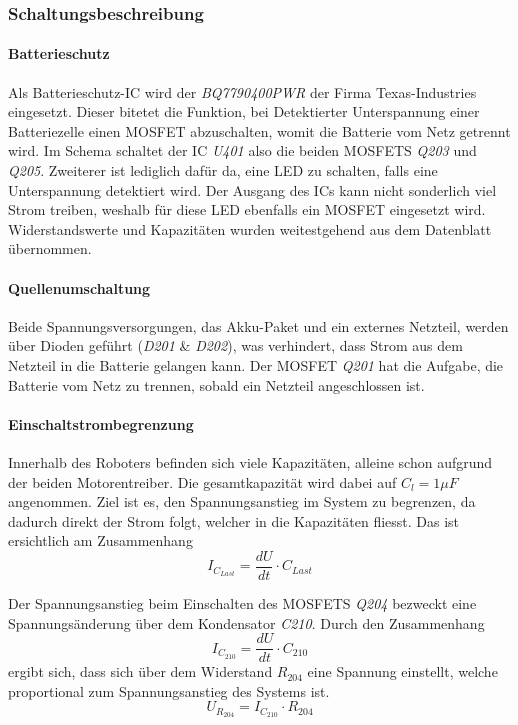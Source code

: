 \documentclass[main.tex]{subfiles} %
\begin{document}
\subsubsection*{Schaltungsbeschreibung}

\paragraph{Batterieschutz}
Als Batterieschutz-IC wird der \textit{BQ7790400PWR} der Firma Texas-Industries
eingesetzt. Dieser bitetet die Funktion, bei Detektierter Unterspannung einer
Batteriezelle einen MOSFET abzuschalten, womit die Batterie vom Netz getrennt
wird. Im Schema schaltet der IC \textit{U401} also die beiden MOSFETS
\textit{Q203} und \textit{Q205}. Zweiterer ist lediglich dafür da, eine LED zu
schalten, falls eine Unterspannung detektiert wird. Der Ausgang des ICs kann
nicht sonderlich viel Strom treiben, weshalb für diese LED ebenfalls ein MOSFET
eingesetzt wird. Widerstandswerte und Kapazitäten wurden weitestgehend aus dem
Datenblatt übernommen.

\paragraph{Quellenumschaltung}
Beide Spannungsversorgungen, das Akku-Paket und ein externes Netzteil, werden
über Dioden geführt (\textit{D201} \& \textit{D202}), was verhindert, dass
Strom aus dem Netzteil in die Batterie gelangen kann. Der MOSFET \textit{Q201}
hat die Aufgabe, die Batterie vom Netz zu trennen, sobald ein Netzteil
angeschlossen ist.

\paragraph{Einschaltstrombegrenzung}
Innerhalb des Roboters befinden sich viele Kapazitäten, alleine schon aufgrund
der beiden Motorentreiber. Die gesamtkapazität wird dabei auf $C_l = 1 \mu F$
angenommen. Ziel ist es, den Spannungsanstieg im System zu begrenzen, da
dadurch direkt der Strom folgt, welcher in die Kapazitäten fliesst. Das ist
ersichtlich am Zusammenhang
\[
    I_{C_{Last}}  = \frac{dU}{dt} \cdot C_{Last}
\]

Der Spannungsanstieg beim Einschalten des MOSFETS \textit{Q204} bezweckt eine
Spannungsänderung über dem Kondensator \textit{C210}. Durch den Zusammenhang
\[
    I_{C_{210}}  = \frac{dU}{dt} \cdot C_{210}
\]
ergibt sich, dass sich über dem Widerstand $R_{204}$ eine Spannung einstellt,
welche proportional zum Spannungsanstieg des Systems ist.
\[
    U_{R_{204}} = I_{C_{210}} \cdot R_{204}
\]
\end{document}
